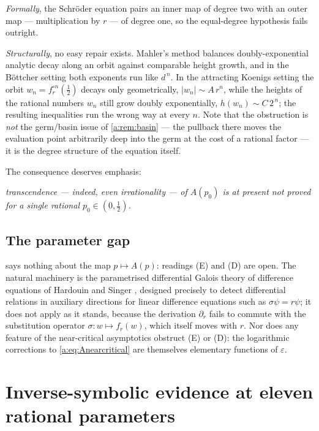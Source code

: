 \emph{Formally}, the Schröder equation pairs an inner map of degree two with an
outer map --- multiplication by $r$ --- of degree one, so the equal-degree
hypothesis fails outright.

\emph{Structurally}, no easy repair exists. Mahler's method balances
doubly-exponential analytic decay along an orbit against comparable height growth,
and in the Böttcher setting both exponents run like $d^{\,n}$. In the attracting
Koenigs setting the orbit $w_n = f_r^{\circ n}(\tfrac12)$ decays only geometrically,
$|w_n|\sim A\,r^{n}$, while the heights of the rational numbers $w_n$ still grow
doubly exponentially, $h(w_n)\sim C\,2^{\,n}$; the resulting inequalities run the
wrong way at every $n$. Note that the obstruction is \emph{not} the germ/basin
issue of \cref{a:rem:basin} --- the pullback there moves the evaluation point
arbitrarily deep into the germ at the cost of a rational factor --- it is the degree
structure of the equation itself.

The consequence deserves emphasis:
\begin{center}
\emph{transcendence --- indeed, even irrationality --- of $A(p_0)$ is at present
not proved\\ for a single rational $p_0\in(0,\tfrac12)$.}
\end{center}

\subsection*{The parameter gap}

 says nothing about the map $p\mapsto A(p)$: readings (E) and (D)
are open. The natural machinery is the parametrised
differential Galois theory of difference equations of Hardouin and Singer
\cite{HardouinSinger2008}, designed precisely to detect differential relations in
auxiliary directions for linear difference equations such as $\sigma\psi = r\psi$;
it does not apply as it stands, because the derivation $\partial_r$ fails to commute
with the substitution operator $\sigma\colon w\mapsto f_r(w)$, which itself moves
with $r$. Nor does any feature of the near-critical asymptotics obstruct (E) or
(D): the logarithmic corrections to \cref{a:eq:Anearcritical} are themselves
elementary functions of $\varepsilon$.

\section{Inverse-symbolic evidence at eleven rational parameters}
\label{a:sec:pslq}

